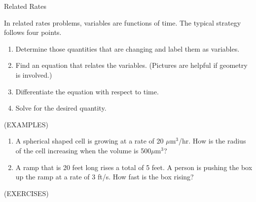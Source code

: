 \documentclass[11pt]{article}
\begin{document}
\begin{center}
\Large
\rm{Related Rates}
\end{center}
In related rates problems, variables are functions of time.  The typical strategy follows four points.
\begin{enumerate}
\item{Determine those quantities that are changing and label them as variables.}
\item{Find an equation that relates the variables.  (Pictures are helpful if geometry is involved.)}
\item{Differentiate the equation with respect to time.}
\item{Solve for the desired quantity.}
  
\end{enumerate}


(EXAMPLES)


\begin{enumerate}
\item{A spherical shaped cell is growing at a rate of 20 $\mu$m$^3$/hr.  How is the radius of the cell increasing when the volume is 500$\mu$m$^3$?}
  \vspace{2.5in}
\item{A ramp that is 20 feet long rises a total of 5 feet.  A person is pushing the box up the ramp at a rate of 3 ft/s.  How fast is the box rising?}

  \end{enumerate}
\pagebreak
(EXERCISES)
\end{document}
